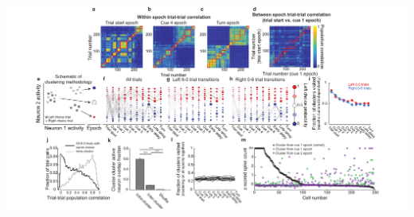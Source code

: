 \begin{FPfigure}
\includegraphics[width=1.2\textwidth,center]{figures/fig_3_6.pdf}
\caption[Clustering neuronal activity across trials to reveals trial-to-trial variability.]
{\textbf{Clustering neuronal activity across trials to reveals trial-to-trial variability. a-c,} Example trial-trial population activity correlation matrices at the trial start epoch (\textbf{a}),  cue 4 epoch (\textbf{b}), and the turn epoch (\textbf{c}) sorted by cluster identity. Red squares indicated cluster membership such that pairs of trials within the same red square were in the same cluster. 
%
\textbf{d,} Example trial-trial population activity correlation matrix for two consecutive epochs (trial start epoch compared to cue 1 epoch). Trials were sorted according to the cluster identity during the trial start epoch. Because trials were sorted identically in both epochs, trial pairs along the diagonal would be expected to have high correlations if trial activity was similar in consecutive epochs. In contrast, the low correlations along the diagonal suggest that trials had highly different population activity in consecutive epochs.
%
\textbf{e,} Schematic demonstrating clustering procedure (Methods \ref{methods:clustering_general}). At each of ten spatially-defined maze epochs, clustering was used to group together individual trials with similar population activity patterns. Clusters at each maze epoch were represented as a column of nodes with area proportional to the number of trials in each cluster. Nodes were colored based on the fraction of trials within each cluster resulting in a left choice. Nodes were sorted vertically from largest to smallest left choice probability. Transition matrices were constructed by calculating the empirical transition probability between adjacent clusters. 
%
\textbf{f,} An example transition matrix constructed from all trials in a single dataset. Edge widths between nodes represent the forward transition probability. Nodes were colored and sorted as described in (\textbf{e}). 
}
\end{FPfigure}
